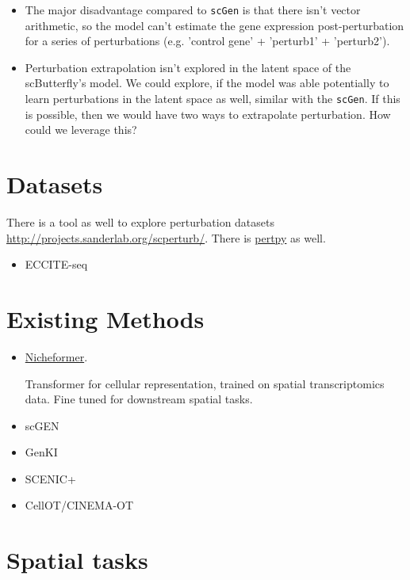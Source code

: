\documentclass[12pt, a4paper]{article}
\begin{document}
\begin{itemize}
  \item The major disadvantage compared to \verb|scGen| is that there isn't vector arithmetic, so the model can't estimate the gene expression post-perturbation for a series of perturbations (e.g. 'control gene' + 'perturb1' + 'perturb2').
  \item Perturbation extrapolation isn't explored in the latent space of the scButterfly's model. We could explore, if the model was able potentially to learn perturbations in the latent space as well, similar with the \verb|scGen|. If this is possible, then we would have two ways to extrapolate perturbation. How could we leverage this?
\end{itemize}


\clearpage

\section{Datasets}

There is a tool as well to explore perturbation datasets \url{http://projects.sanderlab.org/scperturb/}. There is \href{https://github.com/scverse/pertpy}{pertpy} as well.

\begin{itemize}
  \item ECCITE-seq
\end{itemize}

\section{Existing Methods}

\begin{itemize}
  \item \href{https://www.biorxiv.org/content/10.1101/2024.04.15.589472v1}{Nicheformer}.
  
  Transformer for cellular representation, trained on spatial transcriptomics data. Fine tuned for downstream spatial tasks.

  \item scGEN
  \item GenKI
  \item SCENIC+
  \item CellOT/CINEMA-OT
\end{itemize}

\section{Spatial tasks}
\end{document}
